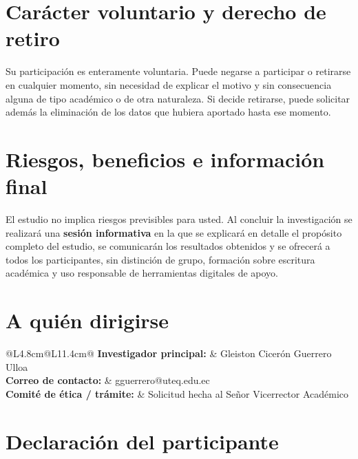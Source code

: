 \documentclass[10.5pt,a4paper]{article}
\begin{document}
\section{Car\'acter voluntario y derecho de retiro}

Su participaci\'on es enteramente voluntaria. Puede negarse a participar o retirarse en cualquier momento, sin necesidad de explicar el motivo y sin consecuencia alguna de tipo acad\'emico o de otra naturaleza. Si decide retirarse, puede solicitar adem\'as la eliminaci\'on de los datos que hubiera aportado hasta ese momento.

\section{Riesgos, beneficios e informaci\'on final}

El estudio no implica riesgos previsibles para usted. Al concluir la investigaci\'on se realizar\'a una \textbf{sesi\'on informativa} en la que se explicar\'a en detalle el prop\'osito completo del estudio, se comunicar\'an los resultados obtenidos y se ofrecer\'a a todos los participantes, sin distinci\'on de grupo, formaci\'on sobre escritura acad\'emica y uso responsable de herramientas digitales de apoyo.

\section{A qui\'en dirigirse}

\begin{tabular}{@{}L{4.8cm}@{}L{11.4cm}@{}}
	\textbf{\small Investigador principal:} & Gleiston Cicerón Guerrero Ulloa \\
	\textbf{\small Correo de contacto:} & gguerrero@uteq.edu.ec \\
	\textbf{\small Comit\'e de \'etica / trámite:} & Solicitud hecha al Señor Vicerrector Académico \\
\end{tabular}

\section{Declaraci\'on del participante}
\end{document}
